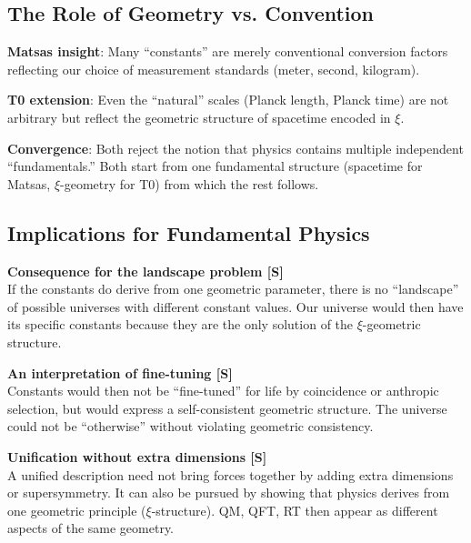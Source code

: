 	\subsection{The Role of Geometry vs. Convention}
	
	\textbf{Matsas insight}: Many ``constants'' are merely conventional conversion factors reflecting our choice of measurement standards (meter, second, kilogram).
	
	\textbf{T0 extension}: Even the ``natural'' scales (Planck length, Planck time) are not arbitrary but reflect the geometric structure of spacetime encoded in $\xi$.
	
	\textbf{Convergence}: Both reject the notion that physics contains multiple independent ``fundamentals.'' Both start from one fundamental structure (spacetime for Matsas, $\xi$-geometry for T0) from which the rest follows.
	
	\subsection{Implications for Fundamental Physics}
	
	\begin{insight}
		\textbf{Consequence for the landscape problem [S]}\\
		If the constants do derive from one geometric parameter, there is no ``landscape'' of possible universes with different constant values. Our universe would then have its specific constants because they are the only solution of the $\xi$-geometric structure.
	\end{insight}
	
	\begin{insight}
		\textbf{An interpretation of fine-tuning [S]}\\
		Constants would then not be ``fine-tuned'' for life by coincidence or anthropic selection, but would express a self-consistent geometric structure. The universe could not be ``otherwise'' without violating geometric consistency.
	\end{insight}
	
	\begin{insight}
		\textbf{Unification without extra dimensions [S]}\\
		A unified description need not bring forces together by adding extra dimensions or supersymmetry. It can also be pursued by showing that physics derives from one geometric principle ($\xi$-structure). QM, QFT, RT then appear as different aspects of the same geometry.
	\end{insight}
	
